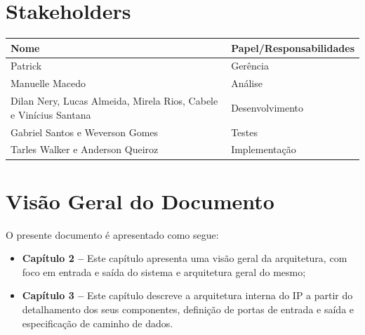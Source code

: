 \documentclass{report}
\begin{document}
  \section{Stakeholders}
    \FloatBarrier
    \begin{table}[H] 
      \begin{center}
        \begin{tabular}[pos]{|m{6cm} | m{8cm}|} 
          \hline 
          \cellcolor[gray]{0.9}\textbf{Nome} & \cellcolor[gray]{0.9}\textbf{Papel/Responsabilidades} \\  
           \hline 
           Patrick 	& Gerência \\
           \hline 
           Manuelle Macedo 	& Análise \\
           \hline 
           Dilan Nery, Lucas Almeida, Mirela Rios, Cabele e Vinícius Santana	& Desenvolvimento \\
           \hline 
           Gabriel Santos e Weverson Gomes	& Testes       \\
           \hline 
           Tarles Walker e Anderson Queiroz 	& Implementação \\ 				       \hline
        \end{tabular}
      \end{center}
    \end{table} 

\section{Visão Geral do Documento}

O presente documento é apresentado como segue:

  \begin{itemize}
   \item \textbf{Capítulo 2 --} Este capítulo apresenta uma visão geral da arquitetura, com foco em entrada e saída do sistema e arquitetura geral do mesmo;
   \item \textbf{Capítulo 3 --} Este capítulo descreve a arquitetura interna do IP a partir do detalhamento dos seus componentes, definição de portas de entrada e saída e especificação de caminho de dados.
  \end{itemize}


\end{document}
